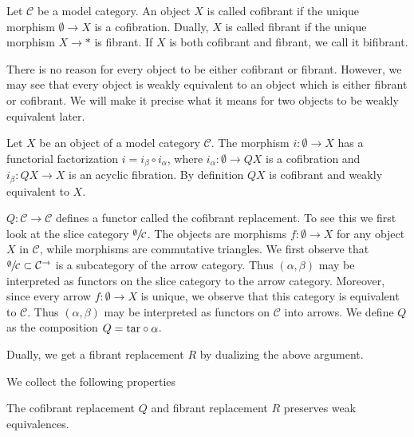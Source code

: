 \documentclass[../thesis.tex]{subfiles}
\begin{document}
            \begin{definition}
                Let $\mathcal{C}$ be a model category. An object $X$ is called cofibrant if the unique morphism $\emptyset \rightarrow X$ is a cofibration. Dually, $X$ is called fibrant if the unique morphism $X \rightarrow *$ is fibrant. If $X$ is both cofibrant and fibrant, we call it bifibrant.
            \end{definition}

            There is no reason for every object to be either cofibrant or fibrant. However, we may see that every object is weakly equivalent to an object which is either fibrant or cofibrant. We will make it precise what it means for two objects to be weakly equivalent later.

            \begin{construction}
                Let $X$ be an object of a model category $\mathcal{C}$. The morphism $i:\emptyset\rightarrow X$ has a functorial factorization $i=i_\beta\circ i_\alpha$, where $i_\alpha: \emptyset\rightarrow QX$ is a cofibration and $i_\beta: QX\rightarrow X$ is an acyclic fibration. By definition $QX$ is cofibrant and weakly equivalent to $X$.

                $Q: \mathcal{C}\rightarrow \mathcal{C}$ defines a functor called the cofibrant replacement. To see this we first look at the slice category $\sfrac{\emptyset}{\mathcal{C}}$. The objects are morphisms $f:\emptyset \rightarrow X$ for any object $X$ in $\mathcal{C}$, while morphisms are commutative triangles. We first observe that $\sfrac{\emptyset}{\mathcal{C}}\subset\mathcal{C}^\rightarrow$ is a subcategory of the arrow category. Thus $(\alpha, \beta)$ may be interpreted as functors on the slice category to the arrow category. Moreover, since every arrow $f:\emptyset \rightarrow X$ is unique, we observe that this category is equivalent to $\mathcal{C}$. Thus $(\alpha, \beta)$ may be interpreted as functors on $\mathcal{C}$ into arrows. We define $Q$ as the composition $Q = \tt{tar} \circ \alpha$.

                Dually, we get a fibrant replacement $R$ by dualizing the above argument.
            \end{construction}

            We collect the following properties

            \begin{lemma}\label{lem: Q-preserves-weak}
                The cofibrant replacement $Q$ and fibrant replacement $R$ preserves weak equivalences. 
            \end{lemma}
\end{document}
